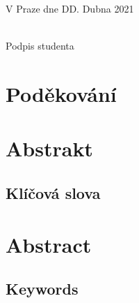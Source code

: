 \vspace{2cm}
\noindent
V Praze dne DD. Dubna 2021
\hfill%
\begin{minipage}[t]{.5\textwidth}%
\begin{center}
\dotfill\\
Podpis studenta
\end{center}
\end{minipage}
\vspace{1cm}

\openright
\vspace*{\fill}
\section*{Poděkování}
\noindent
\Podekovani
\vspace{1cm}


\openright
\section*{Abstrakt}
\noindent
\Abstrakt
\subsection*{Klíčová slova}
\noindent
\KlicovaSlova

\newpage

\bigskip\bigskip\bigskip
\section*{Abstract}
\noindent
{\color{red}
\AbstraktEN
}
\subsection*{Keywords}
\noindent
\KlicovaSlovaEN

\openright
